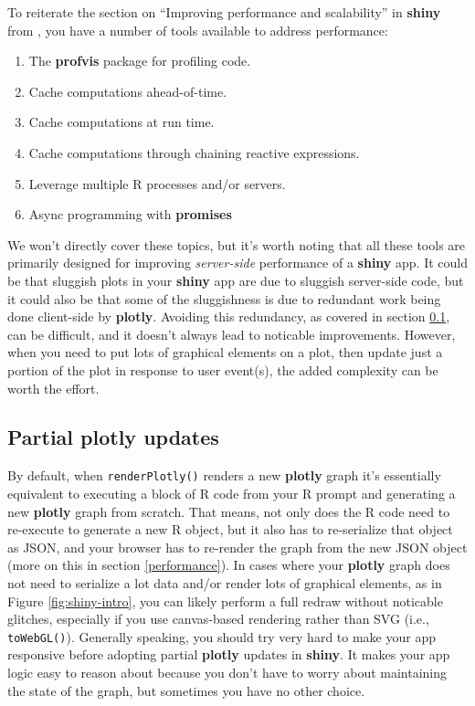 \documentclass[
  12pt,
]{krantz}
\providecommand{\tightlist}{%
  \setlength{\itemsep}{0pt}\setlength{\parskip}{0pt}}
\begin{document}
To reiterate the section on ``Improving performance and scalability'' in \textbf{shiny} from \citet{async}, you have a number of tools available to address performance:

\begin{enumerate}
\def\labelenumi{\arabic{enumi}.}
\tightlist
\item
  The \textbf{profvis} package for profiling code.
\item
  Cache computations ahead-of-time.
\item
  Cache computations at run time.
\item
  Cache computations through chaining reactive expressions.
\item
  Leverage multiple R processes and/or servers.
\item
  Async programming with \textbf{promises}
\end{enumerate}

We won't directly cover these topics, but it's worth noting that all these tools are primarily designed for improving \emph{server-side} performance of a \textbf{shiny} app. It could be that sluggish plots in your \textbf{shiny} app are due to sluggish server-side code, but it could also be that some of the sluggishness is due to redundant work being done client-side by \textbf{plotly}. Avoiding this redundancy, as covered in section \ref{proxies}, can be difficult, and it doesn't always lead to noticable improvements. However, when you need to put lots of graphical elements on a plot, then update just a portion of the plot in response to user event(s), the added complexity can be worth the effort.

\hypertarget{proxies}{%
\subsection{Partial plotly updates}\label{proxies}}

By default, when \texttt{renderPlotly()} renders a new \textbf{plotly} graph it's essentially equivalent to executing a block of R code from your R prompt and generating a new \textbf{plotly} graph from scratch. That means, not only does the R code need to re-execute to generate a new R object, but it also has to re-serialize that object as JSON, and your browser has to re-render the graph from the new JSON object (more on this in section \ref{performance}). In cases where your \textbf{plotly} graph does not need to serialize a lot data and/or render lots of graphical elements, as in Figure \ref{fig:shiny-intro}, you can likely perform a full redraw without noticable glitches, especially if you use canvas-based rendering rather than SVG (i.e., \texttt{toWebGL()}). Generally speaking, you should try very hard to make your app responsive before adopting partial \textbf{plotly} updates in \textbf{shiny}. It makes your app logic easy to reason about because you don't have to worry about maintaining the state of the graph, but sometimes you have no other choice.
\end{document}
